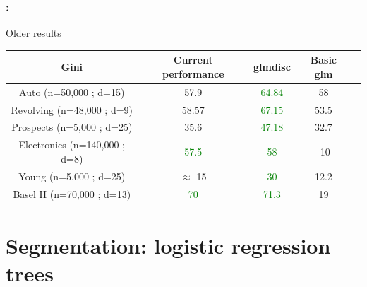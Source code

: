\documentclass[english,xcolor={rgb,dvipsnames,table,usenames}]{beamer}
\begin{document}
\begin{frame}
\frametitle{\secname : \subsecname}

Older results

\begin{table}[t]
\begin{center}
\begin{adjustbox}{max width=0.99\textwidth}

\begin{tabular}{|c||c|c|c|c|}
\hline  Gini & Current performance & \textbf{glmdisc} & Basic \textbf{glm} \\
\hline
\hline   Auto (n=50,000 ; d=15) & 57.9 & \textcolor{green}{64.84} & 58\\
\hline   Revolving (n=48,000 ; d=9) & 58.57 & \textcolor{green}{67.15} & 53.5 \\
\hline   Prospects (n=5,000 ; d=25) & 35.6 & \textcolor{green}{47.18} & 32.7\\
\hline   Electronics (n=140,000 ; d=8) & \textcolor{green}{57.5} & \textcolor{green}{58} & -10 \\
\hline   Young (n=5,000 ; d=25) & $\approx$ 15 & \textcolor{green}{30} & 12.2 \\
\hline   Basel II (n=70,000 ; d=13) & \textcolor{green}{70} & \textcolor{green}{71.3} & 19 \\
\hline 
\end{tabular}

\end{adjustbox}
\end{center}
\end{table}


\end{frame}





\section{Segmentation: logistic regression trees}
\end{document}
